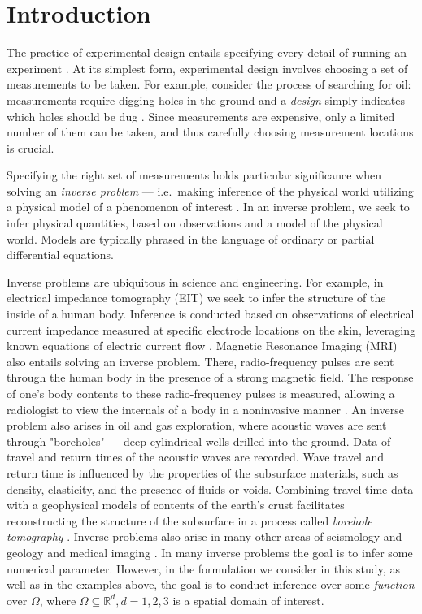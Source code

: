 \documentclass[ba]{imsart}
\theoremstyle{plain}
\theoremstyle{definition}
\theoremstyle{remark}
\begin{document}
\section{Introduction}\label{section:intro}
The practice of experimental design entails specifying every detail of
running an experiment \cite{chaloner1995}. At its simplest form,
experimental design involves choosing a set of measurements to be
taken. For example, consider the process of searching for oil:
measurements require digging holes in the ground and a \emph{design}
simply indicates which holes should be dug
\cite{horesh2008borehole}. Since measurements are expensive, only a
limited number of them can be taken, and thus carefully choosing
measurement locations is crucial.

Specifying the right set of measurements holds particular significance
when solving an \emph{inverse problem} --- i.e.~making inference of
the physical world utilizing a physical model of a phenomenon of
interest \cite{tarantola2005,kaipio2005}. In an inverse problem, we
seek to infer physical quantities, based on observations and a model
of the physical world. Models are typically phrased in the language of
ordinary or partial differential equations.

Inverse problems are ubiquitous in science and engineering. For
example, in electrical impedance tomography (EIT) we seek to infer the
structure of the inside of a human body. Inference is conducted based
on observations of electrical current impedance measured at specific
electrode locations on the skin, leveraging known equations of
electric current flow \cite{horesh2010impedance}. Magnetic Resonance
Imaging (MRI) also entails solving an inverse problem. There,
radio-frequency pulses are sent through the human body in the presence
of a strong magnetic field. The response of one's body contents to
these radio-frequency pulses is measured, allowing a radiologist to
view the internals of a body in a noninvasive manner
\cite{horesh2008mri}. An inverse problem also arises in oil and gas
exploration, where acoustic waves are sent through "boreholes" ---
deep cylindrical wells drilled into the ground. Data of travel and
return times of the acoustic waves are recorded. Wave travel and
return time is influenced by the properties of the subsurface
materials, such as density, elasticity, and the presence of fluids or
voids. Combining travel time data with a geophysical models of
contents of the earth's crust facilitates reconstructing the structure
of the subsurface in a process called \emph{borehole tomography}
\cite{horesh2008borehole}. Inverse problems also arise in many other
areas of seismology and geology \cite{rabinowitz1990, steinberg1995}
and medical imaging \cite{tarantola2005}. In many inverse problems the
goal is to infer some numerical parameter. However, in the formulation
we consider in this study, as well as in the examples above, the goal
is to conduct inference over some \emph{function} over $\Omega$, where
\(\Omega \subseteq \mathbb{R}^d, d=1,2,3\) is a spatial domain of
interest.
\end{document}
